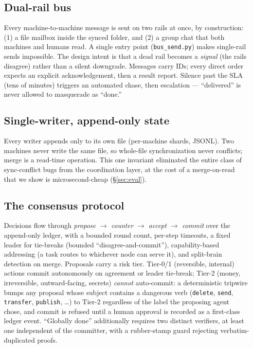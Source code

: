 \documentclass[11pt]{article}
\begin{document}
\subsection{Dual-rail bus}
Every machine-to-machine message is sent on two rails at once, by construction: (1) a file mailbox inside the synced folder, and (2) a group chat that both machines and humans read. A single entry point (\texttt{bus\_send.py}) makes single-rail sends impossible. The design intent is that a dead rail becomes a \emph{signal} (the rails disagree) rather than a silent downgrade. Messages carry IDs; every direct order expects an explicit acknowledgement, then a result report. Silence past the SLA (tens of minutes) triggers an automated chase, then escalation --- ``delivered'' is never allowed to masquerade as ``done.''

\subsection{Single-writer, append-only state}
Every writer appends only to its own file (per-machine shards, JSONL). Two machines never write the same file, so whole-file synchronization never conflicts; merge is a read-time operation. This one invariant eliminated the entire class of sync-conflict bugs from the coordination layer, at the cost of a merge-on-read that we show is microsecond-cheap (\S\ref{sec:eval}).

\subsection{The consensus protocol}
Decisions flow through \emph{propose $\to$ counter $\to$ accept $\to$ commit} over the append-only ledger, with a bounded round count, per-step timeouts, a fixed leader for tie-breaks (bounded ``disagree-and-commit''), capability-based addressing (a task routes to whichever node can serve it), and split-brain detection on merge. Proposals carry a risk tier. Tier-0/1 (reversible, internal) actions commit autonomously on agreement or leader tie-break; Tier-2 (money, irreversible, outward-facing, secrets) \emph{cannot} auto-commit: a deterministic tripwire bumps any proposal whose subject contains a dangerous verb (\texttt{delete}, \texttt{send}, \texttt{transfer}, \texttt{publish}, \dots) to Tier-2 regardless of the label the proposing agent chose, and commit is refused until a human approval is recorded as a first-class ledger event. ``Globally done'' additionally requires two distinct verifiers, at least one independent of the committer, with a rubber-stamp guard rejecting verbatim-duplicated proofs.
\end{document}
